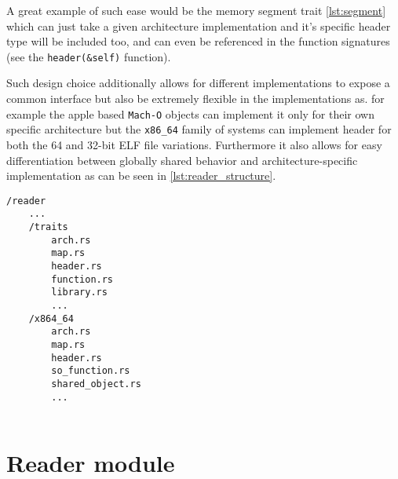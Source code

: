 A great example of such ease would be the memory segment trait \ref{lst:segment} which can just take a given architecture implementation and it's specific header type will be included too, and can even be referenced in the function signatures (see the \verb|header(&self)| function).

Such design choice additionally allows for different implementations to expose a common interface but also be extremely flexible in the implementations as. for example the apple based \verb|Mach-O| objects can implement it only for their own specific architecture but the \verb|x86_64| family of systems can implement header for both the 64 and 32-bit ELF file variations. Furthermore it also allows for easy differentiation between globally shared behavior and architecture-specific implementation as can be seen in \ref{lst:reader_structure}.

\begin{lstlisting}[caption=\label{lst:reader_structure}"Structure of the reader module outlining separate trait and implementation folder"]
/reader
    ...
    /traits
        arch.rs
        map.rs
        header.rs
        function.rs
        library.rs
        ...
    /x864_64
        arch.rs
        map.rs
        header.rs
        so_function.rs
        shared_object.rs
        ...
        
\end{lstlisting}

\section{Reader module}
\label{reader}

